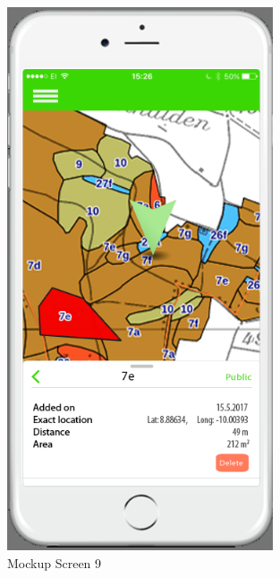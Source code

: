 \begin{figure}[H]
\centering
    \includegraphics[width=0.7\textwidth]{mockup1-9}
    \caption{Mockup Screen 9}
    \label{fig:mesh9}
\end{figure}



